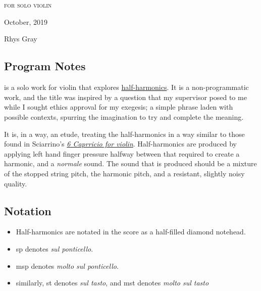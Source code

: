 \newpage

\chapter[\violinPiece]{}


\vspace*{3cm}
\begin{center}
\textsc{for solo violin}
\vspace*{3.5cm}

\HRule{0.5pt}


\LARGE \textbf{\uppercase{\violinPiece}}
\HRule{2pt}

\vspace{1.3cm}

\normalsize October, 2019
\date{}

\vspace*{5\baselineskip}

Rhys Gray

\end{center}
\newpage
\section*{Program Notes}
\violinPiece\space is a solo work for violin that explores \hyperref[sec:half-harmonics]{half-harmonics}.
It is a non-programmatic work, and the title was inspired by a question that my supervisor posed to me while I sought ethics approval for my exegesis; a simple phrase laden with possible contexts, spurring the imagination to try and complete the meaning.

It is, in a way, an etude, treating the half-harmonics in a way similar to those found in Sciarrino's \hyperref[fig:sciarrinoExcerpt]{\emph{6 Caprricio for violin}}. 
Half-harmonics are produced by applying left hand finger pressure halfway between that required to create a harmonic, and a \emph{normale} sound. 
The sound that is produced should be a mixture of the stopped string pitch, the harmonic pitch, and a resistant, slightly noisy quality.

\section*{Notation}
\begin{itemize}

    \item Half-harmonics are notated in the score as a half-filled diamond notehead.
    \item sp denotes \emph{sul ponticello}.
    \item msp denotes \emph{molto sul ponticello}.
    \item similarly, st denotes \emph{sul tasto}, and mst denotes \emph{molto sul tasto}
\end{itemize}

\newpage\label{violinPiece}
